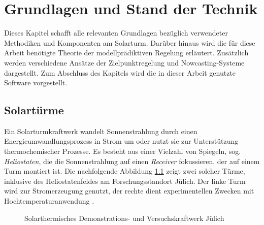 \chapter{Grundlagen und Stand der Technik} \label{ch_StandTechnik}
Dieses Kapitel schafft alle relevanten Grundlagen bezüglich verwendeter Methodiken und Komponenten am Solarturm.
Darüber hinaus wird die für diese Arbeit benötigte Theorie der modellprädiktiven Regelung erläutert.
Zusätzlich werden verschiedene Ansätze der Zielpunktregelung und Nowcasting-Systeme dargestellt.
Zum Abschluss des Kapitels wird die in dieser Arbeit genutzte Software vorgestellt.

\section{Solartürme} \label{sec_Solartürme}
Ein Solarturmkraftwerk wandelt Sonnenstrahlung durch einen Energieumwandlungsprozess in Strom um oder nutzt sie zur Unterstützung thermochemischer Prozesse.
Es besteht aus einer Vielzahl von Spiegeln, sog. \textit{Heliostaten}, die die Sonnenstrahlung auf einen \textit{Receiver} fokussieren, der auf einem Turm montiert ist.
Die nachfolgende Abbildung \ref{fig_Solarturm} zeigt zwei solcher Türme, inklusive des Heliostatenfeldes am Forschungsstandort Jülich.
Der linke Turm wird zur Stromerzeugung genutzt, der rechte dient experimentellen Zwecken mit Hochtemperaturanwendung \cite{DLRSolartürmeBild}.

\begin{figure}[h!]
    \centering
    \setlength{\fboxsep}{1pt}
    \setlength{\fboxrule}{1pt}
\caption[Solarthermisches Demonstrations- und Versuchskraftwerk Jülich]{Solarthermisches Demonstrations- und Versuchskraftwerk Jülich \cite{DLRSolartürmeBild}}
    \label{fig_Solarturm}
\end{figure}

